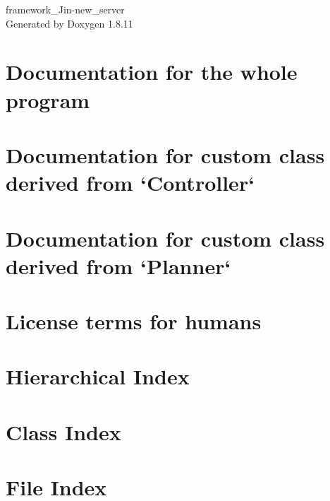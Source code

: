 \documentclass[twoside]{book}
\newcommand{\+}{\discretionary{\mbox{\scriptsize$\hookleftarrow$}}{}{}}
\newcommand{\clearemptydoublepage}{%
  \newpage{\pagestyle{empty}\cleardoublepage}%
}
\begin{document}
\hypersetup{pageanchor=false,
             bookmarksnumbered=true,
             pdfencoding=unicode
            }
\begin{titlepage}
\vspace*{7cm}
\begin{center}%
{\Large framework\+\_\+\+Jin-\/new\+\_\+server }\\
\vspace*{1cm}
{\large Generated by Doxygen 1.8.11}\\
\end{center}
\end{titlepage}
\clearemptydoublepage
\tableofcontents
\clearemptydoublepage
{}
\hypersetup{pageanchor=true}

\chapter{Documentation for the whole program}
\label{index}\hypertarget{index}{}
\chapter{Documentation for custom class derived from `\+Controller`}
\label{md_README-controller}
\hypertarget{md_README-controller}{}

\chapter{Documentation for custom class derived from `\+Planner`}
\label{md_README-planner}
\hypertarget{md_README-planner}{}

\chapter{License terms for humans}
\label{md_rpclib_LICENSE}
\hypertarget{md_rpclib_LICENSE}{}

\chapter{Hierarchical Index}

\chapter{Class Index}

\chapter{File Index}

\end{document}

